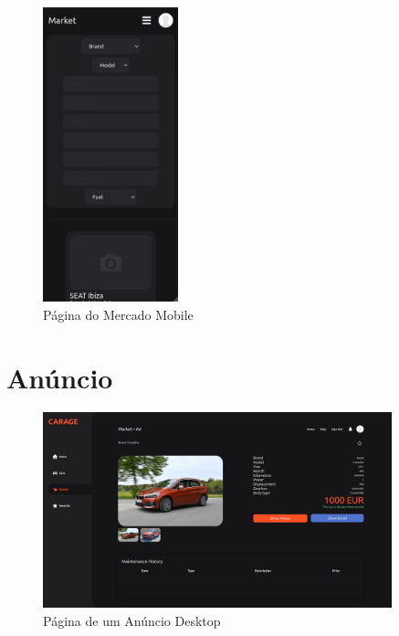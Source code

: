 \documentclass[a4paper]{report}
\begin{document}
\begin{figure}[H]
    \centering
    \includegraphics[width=0.35\textwidth]{images/market_mobile.png}
    \caption{Página do Mercado Mobile}
\end{figure}


\section{Anúncio}

\begin{figure}[H]
    \centering
    \includegraphics[width=0.9\textwidth]{images/ad.png}
    \caption{Página de um Anúncio Desktop}
\end{figure}
\end{document}
